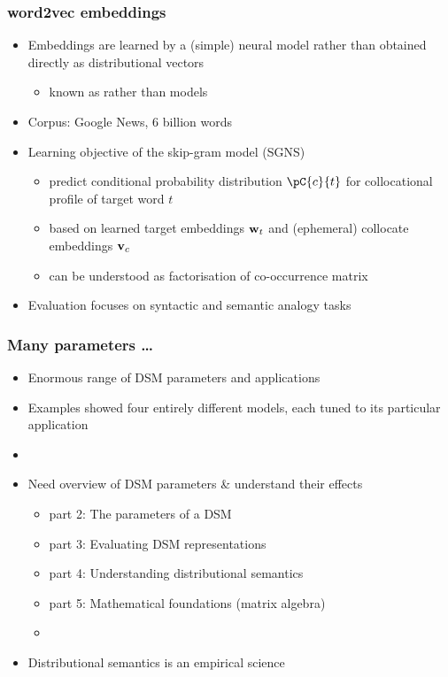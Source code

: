 \documentclass[t]{beamer} %
\begin{document}
\begin{frame}
  \frametitle{word2vec embeddings \citep{Mikolov:etc:13b,Mikolov:etc:13}}

  \begin{itemize}
  \item Embeddings are learned by a (simple) neural model rather than obtained directly as distributional vectors
    \begin{itemize}
    \item known as  rather than  models \citep{Baroni:Dinu:Kruszewski:14}
    \end{itemize}
  \item Corpus: Google News, 6 billion words
  \item Learning objective of the skip-gram model (SGNS)
    \begin{itemize}
    \item predict conditional probability distribution $\pC{c}{t}$ for collocational profile of target word $t$
    \item based on learned target embeddings $\vw_t$ and (ephemeral) collocate embeddings $\vv_c$
    \item[\hand] can be understood as factorisation of co-occurrence matrix \citep{Levy:Goldberg:14,Pennington:Socher:Manning:14}
    \end{itemize}
  \item Evaluation focuses on syntactic and semantic analogy tasks
  \end{itemize}
\end{frame}

\begin{frame}
  \frametitle{Many parameters \ldots}

  \begin{itemize}
  \item Enormous range of DSM parameters and applications
  \item Examples showed four entirely different models, each tuned to its particular application
  \item[]
  \item<2->[\So] Need overview of DSM parameters \& understand their effects
    \begin{itemize}
    \item part 2: The parameters of a DSM
    \item part 3: Evaluating DSM representations
    \item part 4: Understanding distributional semantics
    \item part 5: Mathematical foundations (matrix algebra)
    \item[]
    \end{itemize}
  \item<3->[\So] Distributional semantics is an empirical science
  \end{itemize}
\end{frame}
\end{document}
